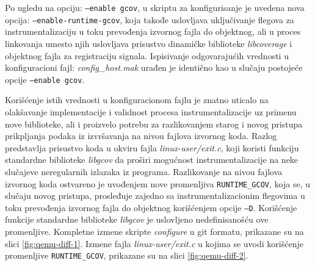 \documentclass[12pt,oneside]{memoir}
\newcommand{\kod}[1]{\texttt{#1}}
\newcommand{\strano}[1]{\textit{#1}}
\begin{document}
Po ugledu na opciju: \kod{--enable gcov}, u skriptu za konfigurisanje je uvedena nova opcija: \kod{--enable-runtime-gcov}, koja takođe uslovljava uključivanje flegova za instrumentalizaciju u toku prevođenja izvornog fajla do objektnog, ali u proces linkovanja umesto njih uslovljava prisustvo dinamičke biblioteke \strano{libcoverage} i objektnog fajla za registraciju signala. Ispisivanje odgovarajućih vrednosti u konfiguracioni fajl: \strano{config\_host.mak} urađen je identično kao u slučaju postojeće opcije \kod{--enable gcov}. 

Korišćenje istih vrednosti u konfiguracionom fajlu je znatno uticalo na olakšavanje implementacije i validnost procesa instrumentalizacije uz primenu nove biblioteke, ali i proizvelo potrebu za razlikovanjem starog i novog pristupa prikpljanja podaka iz izvršavanja na nivou fajlova izvornog koda. Razlog predstavlja prisustvo koda u okviru fajla \strano{linux-user/exit.c}, koji koristi funkciju standardne biblioteke \strano{libgcov} da proširi mogućnost instrumentalizacije na neke slučajeve neregularnih izlazaka iz programa. Razlikovanje na nivou fajlova izvornog koda ostvareno je uvođenjem nove promenljiva \kod{RUNTIME\_GCOV}, koja se, u slučaju novog pristupa, prosleđuje zajedno sa instrumentalizacionim flegovima u toku prevođenja izvornog fajla do objektnog korišćenjem opcije \kod{–D}. Korišćenje funkcije standardne biblioteke \strano{libgcov} je uslovljeno nedefinisanošću ove promenljive. Kompletne izmene skripte \strano{configure} u git formatu, prikazane su na slici \ref{fig:qemu-diff-1}. Izmene fajla \strano{linux-user/exit.c} u kojima se uvodi korišćenje promenljive \kod{RUNTIME\_GCOV}, prikazane su na slici \ref{fig:qemu-diff-2}. 
\end{document}
